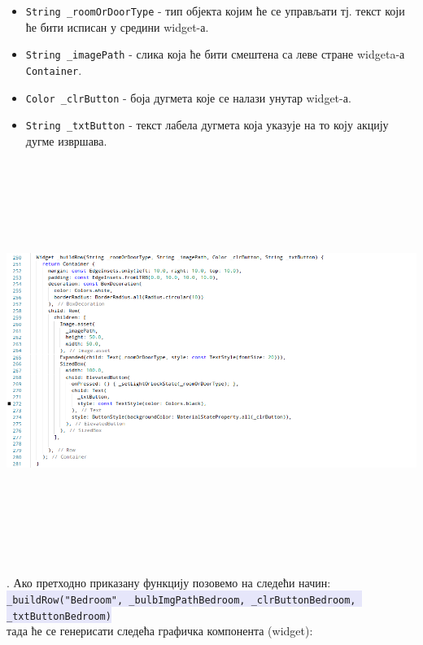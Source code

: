 \documentclass[12pt]{article}
\newcommand{\mycode}[1]{\texttt{\colorbox{Lavender}{#1}}}
\begin{document}
\begin{itemize}
    \item \texttt{String \_roomOrDoorType} - тип објекта којим ће се управљати тј. текст који ће бити исписан у средини widget-а.
    \item \texttt{String \_imagePath} - слика која ће бити смештена са леве стране widgeta-а \texttt{Container}.
    \item \texttt{Color \_clrButton} - боја дугмета које се налази унутар widget-а.
    \item \texttt{String \_txtButton} - текст лабела дугмета која указује на то коју акцију дугме извршава. 
\end{itemize}
\begin{center}
    \centering 
    \includegraphics[height=13cm, width=20cm]{images/dart9}
\end{center}
\vspace{0.3cm}
\indent{}. Ако претходно приказану функцију позовемо на следећи начин:
\vspace{0.3cm}\\
\mycode{\_buildRow("Bedroom", \_bulbImgPathBedroom, \_clrButtonBedroom, \_txtButtonBedroom)}
\vspace{0.1cm}\\
тада ће се генерисати следећа графичка компонента (widget):
\end{document}
